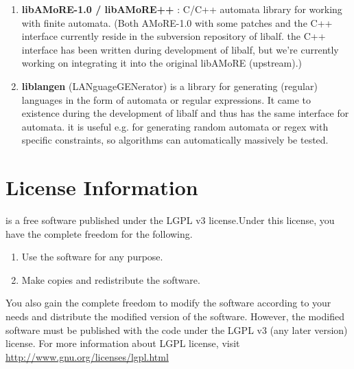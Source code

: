 \begin{enumerate}
 \item \textbf{libAMoRE-1.0 / libAMoRE++} : C/C++ automata library for working with finite automata. 
(Both AMoRE-1.0 with some patches and the C++ interface currently reside in the subversion repository of libalf. the C++ interface has  been written during development of libalf, but we're currently working on integrating it into the original libAMoRE (upstream).)
 \item \textbf{liblangen} (LANguageGENerator) is a library for generating (regular) languages in the form of automata or regular expressions. It came to existence during the development of libalf and thus has the same interface for automata. it is useful e.g. for generating random automata or regex with specific constraints, so algorithms can automatically massively be tested.
\end{enumerate}

\section{License Information}
\libalf is a free software published under the LGPL v3 license.Under this license, you have the complete freedom for the following.
\begin{enumerate}
 \item Use the software for any purpose.
 \item Make copies and redistribute the software.
\end{enumerate}
You also gain the complete freedom to modify the software according to your needs and distribute the modified version of the software. However, the modified software must be published with the code under the LGPL v3 (any later version) license. 
For more information about LGPL license, visit \url{http://www.gnu.org/licenses/lgpl.html}



